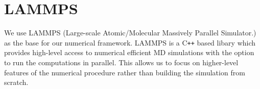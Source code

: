 

\section{LAMMPS}
We use LAMMPS (Large-scale Atomic/Molecular Massively Parallel Simulator.) \cite{LAMMPS} as the base for our numerical framework. LAMMPS is a C\texttt{++} based libary which provides high-level access to numerical efficient \acrshort{MD} simulations with the option to run the computations in parallel. This allows us to focus on higher-level features of the numerical procedure rather than building the simulation from scratch. 